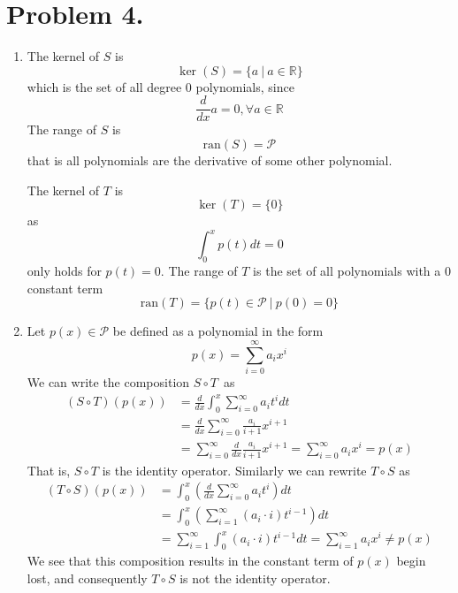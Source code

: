 \documentclass[a4paper,11pt,norsk]{article}
\begin{document}
\section*{Problem 4.}
\begin{enumerate}
    \item The kernel of $S$ is
        $$\ker(S) = \{ a \:|\: a \in \mathbb{R}\}$$
        which is the set of all degree 0 polynomials, since
        $$\frac{d}{dx}a = 0, \forall a \in \mathbb{R}$$
        The range of $S$ is
        $$\text{ran}(S) = \mathcal{P}$$
        that is all polynomials are the derivative of some other polynomial.

        The kernel of $T$ is 
        $$\ker(T) = \{0\}$$
        as 
        $$\int_{0}^{x} p(t) dt = 0$$
        only holds for $p(t) = 0$.
        The range of $T$ is the set of all polynomials with a 0 constant term
        $$\text{ran}(T) = \{ p(t) \in \mathcal{P} \:|\: p(0) = 0\}$$

    \item 
        Let $p(x) \in \mathcal{P}$ be defined as a polynomial in the form
        \[
            p(x) = \sum_{i = 0}^{\infty} a_i x^i
        \]
        We can write the composition $S \circ T$ as 
        \begin{align*}
            (S \circ T)(p(x)) &= \frac{d}{dx} \int_{0}^{x} \sum_{i = 0}^{\infty} a_i t^{i} dt \\
                              &= \frac{d}{dx} \sum_{i = 0}^{\infty} \frac{a_i}{i+1} x^{i+1} \\
                              &= \sum_{i = 0}^{\infty} \frac{d}{dx} \frac{a_i}{i+1} x^{i+1} = \sum_{i = 0}^{\infty} a_i x^{i} = p(x)
        \end{align*}
        That is, $S \circ T$ is the identity operator. Similarly we can rewrite $T \circ S$ as 
        \begin{align*}
            (T \circ S)(p(x)) &= \int_{0}^{x} \left(\frac{d}{dx} \sum_{i = 0}^{\infty} a_i t^{i} \right)dt \\
                              &= \int_{0}^{x} \left(\sum_{i = 1}^{\infty} (a_i \cdot i) t^{i-1} \right)dt \\
                              &= \sum_{i = 1}^{\infty} \int_{0}^{x} (a_i \cdot i) t^{i-1} dt = \sum_{i = 1}^{\infty} a_i x^{i} \neq p(x)
        \end{align*}
        We see that this composition results in the constant term of $p(x)$ begin lost, and consequently $T \circ S$ is not the 
        identity operator.
\end{enumerate}
\end{document}
